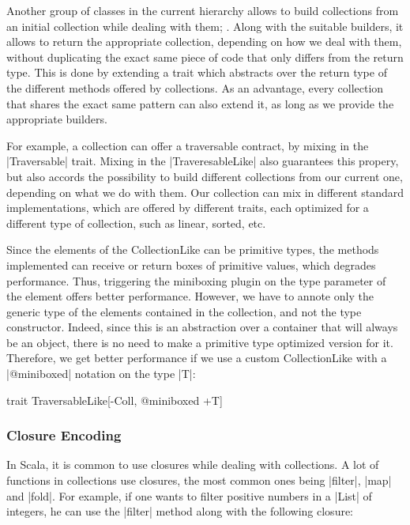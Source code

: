 Another group of classes in the current hierarchy allows to build collections from an initial collection while dealing with them; . Along with the suitable builders, it allows to return the appropriate collection, depending on how we deal with them, without duplicating the exact same piece of code that only differs from the return type. This is done by extending a trait which abstracts over the return type of the different methods offered by collections. As an advantage, every collection that shares the exact same pattern can also extend it, as long as we provide the appropriate builders.

For example, a collection can offer a traversable contract, by mixing in the |Traversable| trait. Mixing in the |TraveresableLike| also guarantees this propery, but also accords the possibility to build different collections from our current one, depending on what we do with them. Our collection can mix in different standard implementations, which are offered by different traits, each optimized for a different type of collection, such as linear, sorted, etc.

Since the elements of the CollectionLike can be primitive types, the methods implemented can receive or return boxes of primitive values, which degrades performance. Thus, triggering the miniboxing plugin on the type parameter of the element offers better performance. However, we have to annote only the generic type of the elements contained in the collection, and not the type constructor. Indeed, since this is an abstraction over a container that will always be an object, there is no need to make a primitive type optimized version for it. Therefore, we get better performance if we use a custom CollectionLike with a |@miniboxed| notation on the type |T|:

\begin{lstlisting-nobreak}
 trait TraversableLike[-Coll, @miniboxed +T]
\end{lstlisting-nobreak}

\subsubsection{Closure Encoding}

In Scala, it is common to use closures while dealing with collections. A lot of functions in collections use closures, the most common ones being |filter|, |map| and |fold|. For example, if one wants to filter positive numbers in a |List| of integers, he can use the |filter| method along with the following closure:

